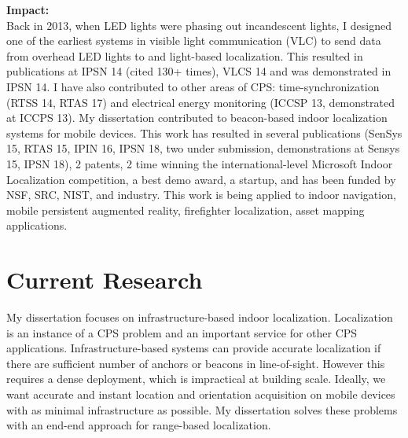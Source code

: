 \documentclass[10pt]{article}
\begin{document}

\textbf{Impact:}\\
Back in 2013, when LED lights were phasing out incandescent lights, I designed one of the earliest systems in visible light communication (VLC) to send data from overhead LED lights to and light-based localization. This resulted in publications at IPSN 14 (cited 130+ times), VLCS 14 and was demonstrated in IPSN 14. I have also contributed to other areas of CPS: time-synchronization (RTSS 14, RTAS 17) and electrical energy monitoring (ICCSP 13, demonstrated at ICCPS 13). My dissertation contributed to beacon-based indoor localization systems for mobile devices. This work has resulted in several publications (SenSys 15, RTAS 15, IPIN 16, IPSN 18, two under submission, demonstrations at Sensys 15, IPSN 18), 2 patents, 2 time winning the international-level Microsoft Indoor Localization competition, a best demo award, a startup, and has been funded by NSF, SRC, NIST, and industry. This work is being applied to indoor navigation, mobile persistent augmented reality, firefighter localization, asset mapping applications. 

\section{Current Research}

My dissertation focuses on infrastructure-based indoor localization. Localization is an instance of a CPS problem and an important service for other CPS applications. Infrastructure-based systems can provide accurate localization if there are sufficient number of anchors or beacons in line-of-sight. However this requires a dense deployment, which is impractical at building scale. Ideally, we want accurate and instant location and orientation acquisition on mobile devices with as minimal infrastructure as possible. My dissertation solves these problems with an end-end approach for range-based localization.\\

\end{document}
